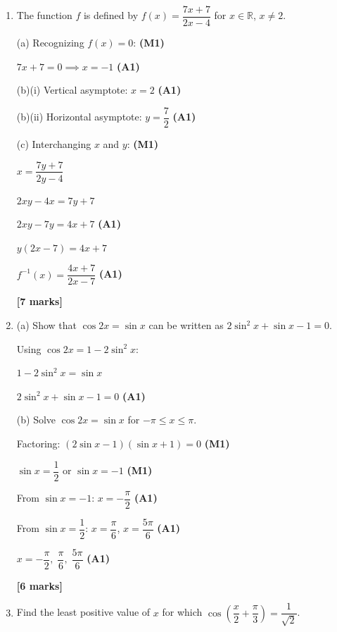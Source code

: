 \documentclass[12pt, twoside]{article}
\begin{document}
\begin{enumerate}[itemsep=0.4cm]
\textbf{[5 marks]}

\bigskip

\item The function $f$ is defined by $f(x) = \dfrac{7x + 7}{2x - 4}$ for $x \in \mathbb{R}$, $x \neq 2$.

(a) Recognizing $f(x) = 0$: \hfill \textbf{(M1)}

$7x + 7 = 0 \implies x = -1$ \hfill \textbf{(A1)}

\medskip
(b)(i) Vertical asymptote: $x = 2$ \hfill \textbf{(A1)}

(b)(ii) Horizontal asymptote: $y = \dfrac{7}{2}$ \hfill \textbf{(A1)}

\medskip
(c) Interchanging $x$ and $y$: \hfill \textbf{(M1)}

$x = \dfrac{7y + 7}{2y - 4}$

$2xy - 4x = 7y + 7$

$2xy - 7y = 4x + 7$ \hfill \textbf{(A1)}

$y(2x - 7) = 4x + 7$

$f^{-1}(x) = \dfrac{4x + 7}{2x - 7}$ \hfill \textbf{(A1)}

\textbf{[7 marks]}

\bigskip

\item (a) Show that $\cos 2x = \sin x$ can be written as $2\sin^2 x + \sin x - 1 = 0$.

Using $\cos 2x = 1 - 2\sin^2 x$:

$1 - 2\sin^2 x = \sin x$

$2\sin^2 x + \sin x - 1 = 0$ \hfill \textbf{(A1)}

\medskip
(b) Solve $\cos 2x = \sin x$ for $-\pi \leq x \leq \pi$.

Factoring: $(2\sin x - 1)(\sin x + 1) = 0$ \hfill \textbf{(M1)}

$\sin x = \dfrac{1}{2}$ or $\sin x = -1$ \hfill \textbf{(M1)}

From $\sin x = -1$: $x = -\dfrac{\pi}{2}$ \hfill \textbf{(A1)}

From $\sin x = \dfrac{1}{2}$: $x = \dfrac{\pi}{6}$, $x = \dfrac{5\pi}{6}$ \hfill \textbf{(A1)}

$x = -\dfrac{\pi}{2},\; \dfrac{\pi}{6},\; \dfrac{5\pi}{6}$ \hfill \textbf{(A1)}

\textbf{[6 marks]}

\bigskip

\item Find the least positive value of $x$ for which $\cos\!\left(\dfrac{x}{2} + \dfrac{\pi}{3}\right) = \dfrac{1}{\sqrt{2}}$.


\end{enumerate}
\end{document}
